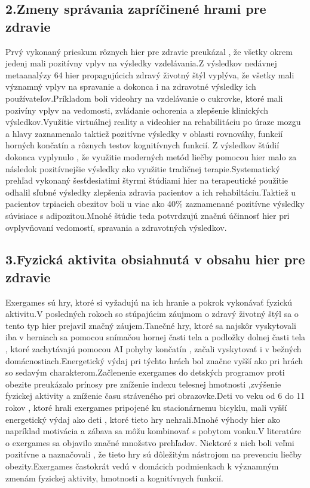 \documentclass[10pt,oneside,slovak,a4paper]{article}
\begin{document}
\subsection{2.Zmeny správania zapríčinené hrami pre zdravie}
Prvý vykonaný prieskum rôznych hier pre zdravie preukázal , že všetky okrem jedenj mali pozitívny vplyv na výsledky vzdelávania.Z výsledkov nedávnej metaanalýzy 64 hier propagujúcich zdravý životný štýl vyplýva, že všetky mali významný vplyv na spravanie a dokonca i na zdravotné výsledky ich používateľov.Príkladom boli videohry na vzdelávanie o cukrovke, ktoré mali pozivíny vplyv na vedomosti, zvládanie ochorenia a zlepšenie klinických výsledkov.Využitie virtuálnej reality a videohier na rehabilitáciu po úraze mozgu a hlavy zaznamenalo taktiež pozitívne výsledky v oblasti rovnováhy, funkcií horných končatín a rôznych testov kognitívnych funkcií. Z výsledkov štúdií dokonca vyplynulo , že využitie moderných metód liečby pomocou hier malo za následok  pozitívnejšie výsledky ako využitie tradičnej terapie.Systematický prehľad vykonaný šesťdesiatimi štyrmi štúdiami hier na terapeutické použitie odhalil sľubné výsledky zlepšenia zdravia pacientov a ich rehabiltáciu.Taktiež u pacientov trpiacich obezitov boli u viac ako 40\% zaznamenané pozitívne výsledky súvisiace s adipozitou.Mnohé štúdie teda potvrdzujú značnú účinnosť hier pri ovplyvňovaní vedomostí, spravania a zdravotných výsledkov.

\subsection{3.Fyzická aktivita obsiahnutá v obsahu hier pre zdravie}
Exergames sú hry, ktoré si vyžadujú na ich hranie a pokrok vykonávať fyzickú aktivitu.V posledných rokoch so stúpajúcim záujmom o zdravý životný štýl sa o tento typ hier prejavil značný záujem.Tanečné hry, ktoré sa najskôr vyskytovali iba v herniach sa pomocou snímačou hornej časti tela a podložky dolnej časti tela , ktoré zachytávajú pomocou AI pohyby končatín , začali vyskytovať i v bežných domácnostiach.Energetický výdaj pri týchto hrách bol značne vyšší ako pri hrách so sedavým charakterom.Začlenenie exergames do detských programov proti obezite preukázalo prínosy pre zníženie indexu telesnej hmotnosti ,zvýšenie fyzickej aktivity a zníženie času stráveného pri obrazovke.Deti vo veku od 6 do 11 rokov , ktoré hrali exergames pripojené ku stacionárnemu bicyklu, mali vyšší energetický výdaj ako deti , ktoré tieto hry nehrali.Mnohé výhody hier ako napríklad motivácia a zábava sa môžu kombinovať s pobytom vonku.V literatúre o exergames sa objavilo značné množstvo prehľadov. Niektoré z nich boli veľmi pozitívne a naznačovali , že tieto hry sú dôležitým nástrojom na prevenciu liečby obezity.Exergames častokrát vedú v domácich podmienkach k významným zmenám fyzickej aktivity, hmotnosti a kognitívnych funkcií.
\end{document}
